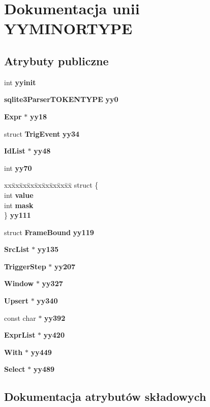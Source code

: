 \section{Dokumentacja unii Y\+Y\+M\+I\+N\+O\+R\+T\+Y\+PE}
\label{union_y_y_m_i_n_o_r_t_y_p_e}
\subsection*{Atrybuty publiczne}
\begin{DoxyCompactItemize}
\item 
int \textbf{ yyinit}
\item 
\textbf{ sqlite3\+Parser\+T\+O\+K\+E\+N\+T\+Y\+PE} \textbf{ yy0}
\item 
\textbf{ Expr} $\ast$ \textbf{ yy18}
\item 
struct \textbf{ Trig\+Event} \textbf{ yy34}
\item 
\textbf{ Id\+List} $\ast$ \textbf{ yy48}
\item 
int \textbf{ yy70}
\item 
\begin{tabbing}
xx\=xx\=xx\=xx\=xx\=xx\=xx\=xx\=xx\=\kill
struct \{\\
\>int \textbf{ value}\\
\>int \textbf{ mask}\\
\} \textbf{ yy111}\\

\end{tabbing}\item 
struct \textbf{ Frame\+Bound} \textbf{ yy119}
\item 
\textbf{ Src\+List} $\ast$ \textbf{ yy135}
\item 
\textbf{ Trigger\+Step} $\ast$ \textbf{ yy207}
\item 
\textbf{ Window} $\ast$ \textbf{ yy327}
\item 
\textbf{ Upsert} $\ast$ \textbf{ yy340}
\item 
const char $\ast$ \textbf{ yy392}
\item 
\textbf{ Expr\+List} $\ast$ \textbf{ yy420}
\item 
\textbf{ With} $\ast$ \textbf{ yy449}
\item 
\textbf{ Select} $\ast$ \textbf{ yy489}
\end{DoxyCompactItemize}


\subsection{Dokumentacja atrybutów składowych}
\mbox{\label{union_y_y_m_i_n_o_r_t_y_p_e_aba553d6abee519200182f1ce31a90910}} 
